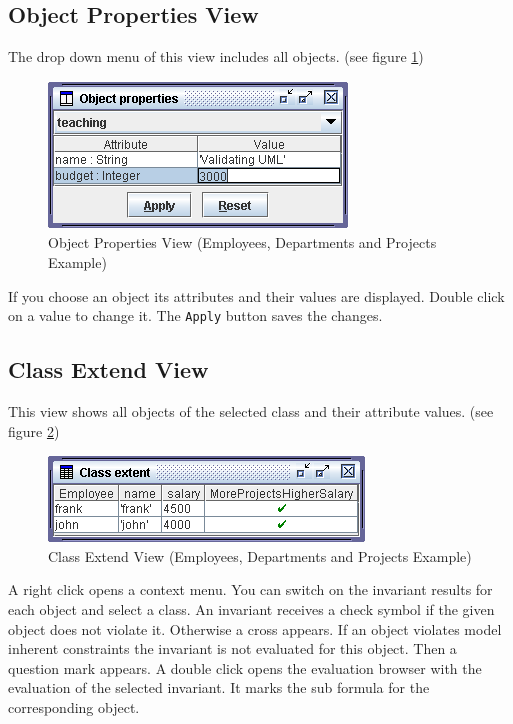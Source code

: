 \documentclass[a4paper,titlepage,oneside,final]{scrreprt} %
\begin{document}
\subsection{Object Properties View}\label{objectpropertiesview}
The drop down menu of this view includes all objects. (see figure \ref{fig:ObjectPropertiesView})
\begin{figure}[ht]
\centering
\includegraphics[scale=0.7]{Screenshots/GUI/Views/ObjectPropertiesView.png}
\caption{Object Properties View (Employees, Departments and Projects Example)}
\label{fig:ObjectPropertiesView}
\end{figure}
If you choose an object its attributes and their values are displayed.
Double click on a value to change it. %
The \verb+Apply+ button saves the changes.
\subsection{Class Extend View}\label{classextendview}
This view shows all objects of the selected class and their attribute values. (see figure \ref{fig:ClassExtendView})
\begin{figure}[ht]
\centering
\includegraphics[scale=0.7]{Screenshots/GUI/Views/ClassExtendView.png}
\caption{Class Extend View (Employees, Departments and Projects Example)}
\label{fig:ClassExtendView}
\end{figure}
A right click opens a context menu. You can switch on the
invariant results for each object and select a class.
An invariant receives a check symbol if the given object does not violate it.
Otherwise a cross appears.
If an object violates model inherent constraints the
invariant is not evaluated for this object. Then a question mark appears.
A double click opens the evaluation browser with the evaluation of
the selected invariant. It marks the sub formula for the corresponding object.
\end{document}
